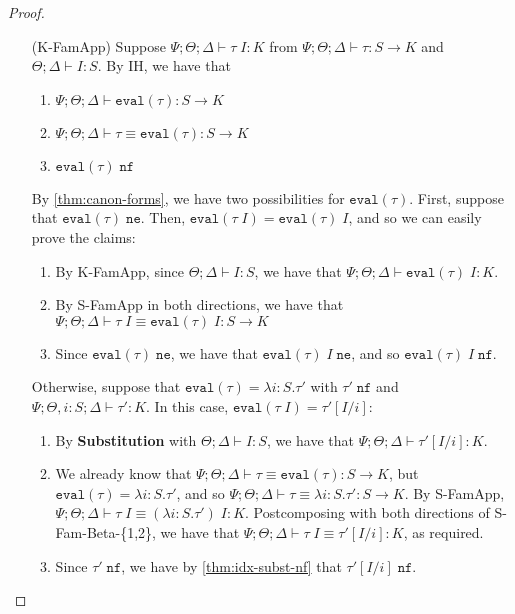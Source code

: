 \begin{proof}
\begin{enumerate}
  \item[(K-FamApp)] Suppose ${\Psi ; \Theta ; \Delta \vdash \tau \; I : K}$ from $\Psi ; \Theta ; \Delta \vdash \tau : S \to K$ and  $\Theta ; \Delta \vdash I : S$. By IH,
  we have that
  \begin{enumerate}[1.]
   \item $\Psi ; \Theta ; \Delta \vdash \texttt{eval}(\tau) : S \to K$
   \item $\Psi ; \Theta ; \Delta \vdash \tau \equiv \texttt{eval}(\tau) : S \to K$
   \item $\texttt{eval}(\tau) \; \texttt{nf}$
  \end{enumerate}
  By \autoref{thm:canon-forms}, we have two possibilities for $\texttt{eval}(\tau)$. First, suppose that  $\texttt{eval}(\tau) \; \texttt{ne}$. Then, $\texttt{eval}(\tau \; I) = \texttt{eval}(\tau) \; I$, and so we can easily prove the claims:
  \begin{enumerate}[1.]
   \item By K-FamApp, since $\Theta ; \Delta \vdash I : S$, we have that $\Psi ; \Theta ; \Delta \vdash \texttt{eval}(\tau) \; I : K$.
   \item By S-FamApp in both directions, we have that $\Psi ; \Theta ; \Delta \vdash \tau \; I \equiv \texttt{eval}(\tau) \; I : S \to K$
   \item Since $\texttt{eval}(\tau) \; \texttt{ne}$, we have that $\texttt{eval}(\tau) \; I \; \texttt{ne}$, and so $\texttt{eval}(\tau) \; I \; \texttt{nf}$.
  \end{enumerate}
  Otherwise, suppose that $\texttt{eval}(\tau) = \lambda i : S. \tau'$ with $\tau' \; \texttt{nf}$ and $\Psi ; \Theta , i : S ; \Delta \vdash \tau' : K$. In this case, $\texttt{eval}(\tau \; I) = \tau'[I/i]$:
  \begin{enumerate}[1.]
   \item By \textbf{Substitution} with $\Theta ; \Delta \vdash I : S$, we have that $\Psi ; \Theta ; \Delta \vdash \tau'[I/i] : K$.
   \item We already know that $\Psi ; \Theta ; \Delta \vdash \tau \equiv \texttt{eval}(\tau) : S \to K$, but $\texttt{eval}(\tau) = \lambda i : S. \tau'$, and so
   $\Psi ; \Theta ; \Delta \vdash \tau \equiv \lambda i : S.\tau' : S \to K$. By S-FamApp, $\Psi ; \Theta ; \Delta \vdash \tau \; I \equiv (\lambda i : S.\tau') \; I : K$. Postcomposing with both directions of S-Fam-Beta-\{1,2\}, we have that $\Psi ; \Theta ; \Delta \vdash \tau \; I \equiv \tau'[I/i] : K$, as required.
   \item Since $\tau'\; \texttt{nf}$, we have by \autoref{thm:idx-subst-nf} that $\tau'[I/i] \; \texttt{nf}$.
  \end{enumerate}
  
\end{enumerate}
\end{proof}